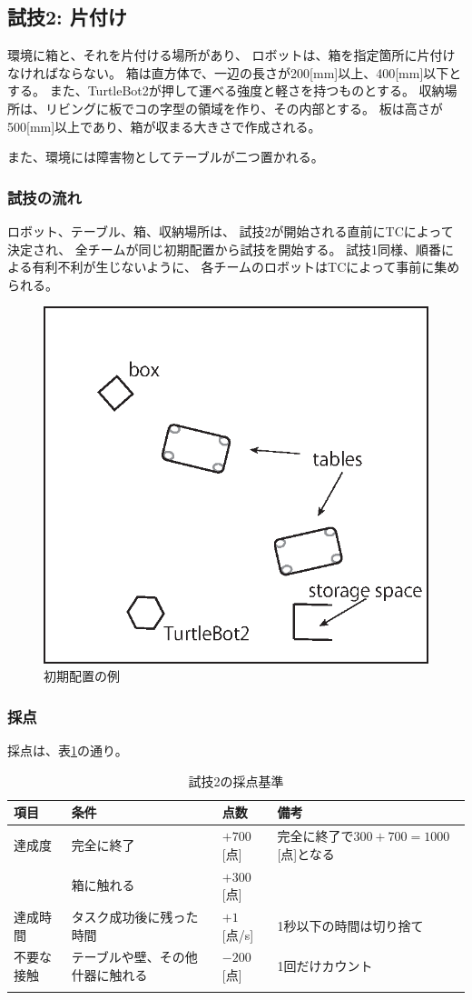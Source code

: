 \documentclass[a4j]{jarticle}
\def\thline{\noalign{\hrule height 1pt}}
\begin{document}
\subsection{試技2: 片付け}

環境に箱と、それを片付ける場所があり、
ロボットは、箱を指定箇所に片付けなければならない。
箱は直方体で、一辺の長さが200[mm]以上、400[mm]以下とする。
また、TurtleBot2が押して運べる強度と軽さを持つものとする。
収納場所は、リビングに板でコの字型の領域を作り、その内部とする。
板は高さが500[mm]以上であり、箱が収まる大きさで作成される。

また、環境には障害物としてテーブルが二つ置かれる。

\subsubsection{試技の流れ}

ロボット、テーブル、箱、収納場所は、
試技2が開始される直前にTCによって決定され、
全チームが同じ初期配置から試技を開始する。
試技1同様、順番による有利不利が生じないように、
各チームのロボットはTCによって事前に集められる。


\begin{figure}[h]
	\begin{center}
		\includegraphics[width=0.4\linewidth]{./IMAGE/test2.eps}
		\caption{初期配置の例}
		\label{fig:test2}
	\end{center}
\end{figure}

\subsubsection{採点}

採点は、表\ref{table:test2score}の通り。

\begin{table}
\begin{center}
\caption{試技2の採点基準}
\label{table:test2score}
\begin{tabular}{l|p{5cm}|l|p{5cm}}
\thline
項目 & 条件 & 点数 & 備考\\
\hline
達成度 & 完全に終了 & $+700$[点] & 完全に終了で$300 + 700 = 1000$[点]となる \\
& 箱に触れる & $+300$[点] & \\
\hline
達成時間 & タスク成功後に残った時間 & $+1$[点/s] & 1秒以下の時間は切り捨て\\
\hline
不要な接触 & テーブルや壁、その他什器に触れる & $-200$[点] & 1回だけカウント\\
\thline
\end{tabular}
\end{center}
\end{table}
\end{document}
